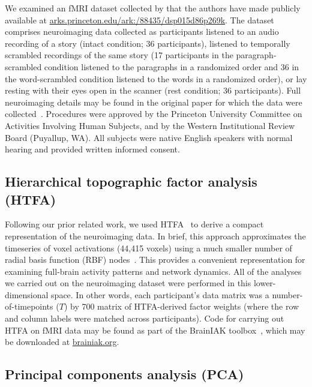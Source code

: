 \documentclass[english, 11pt]{article}
\begin{document}
We examined an fMRI dataset collected by \cite{SimoEtal16} that the authors
have made publicly available at
\href{http://arks.princeton.edu/ark:/88435/dsp015d86p269k}{arks.princeton.edu/ark:/88435/dsp015d86p269k}.
The dataset comprises neuroimaging data collected as participants listened to
an audio recording of a story (intact condition; 36 participants), listened to
temporally scrambled recordings of the same story (17 participants in the
paragraph-scrambled condition listened to the paragraphs in a randomized order
and 36 in the word-scrambled condition listened to the words in a randomized
order), or lay resting with their eyes open in the scanner (rest condition; 36
participants). Full neuroimaging details may be found in the original paper for
which the data were collected~\citep{SimoEtal16}. Procedures were approved by
the Princeton University Committee on Activities Involving Human Subjects, and
by the Western Institutional Review Board (Puyallup, WA). All subjects were
native English speakers with normal hearing and provided written informed
consent.

\subsection*{Hierarchical topographic factor analysis (HTFA)}

Following our prior related work, we used HTFA~\citep{MannEtal18} to derive a
compact representation of the neuroimaging data. In brief, this approach
approximates the timeseries of voxel activations (44,415 voxels) using a much
smaller number of radial basis function (RBF) nodes~\citep[in this case, 700
nodes, as determined by an optimization procedure;][]{MannEtal18}. This
provides a convenient representation for examining full-brain activity patterns
and network dynamics. All of the analyses we carried out on the neuroimaging
dataset were performed in this lower-dimensional space. In other words, each
participant's data matrix was a number-of-timepoints ($T$) by 700 matrix of
HTFA-derived factor weights (where the row and column labels were matched
across participants). Code for carrying out HTFA on fMRI data may be found as
part of the BrainIAK toolbox~\citep{CapoEtal17, KumaEtal21}, which may be
downloaded at \href{https://brainiak.org/}{brainiak.org}.

\subsection*{Principal components analysis (PCA)}
\end{document}
